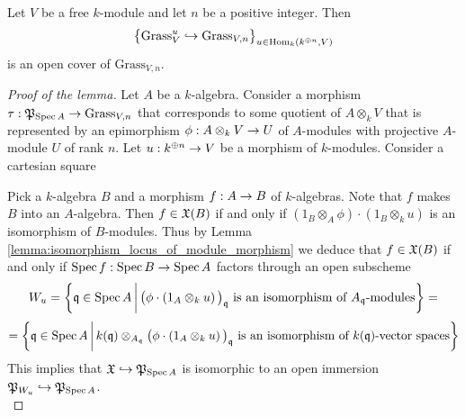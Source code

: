 \begin{lemma}\label{lemma:standard_open_cover_of_grassmannian}
Let $V$ be a free $k$-module and let $n$ be a positive integer. Then
$$\big\{\mathrm{Grass}_{V}^u\hookrightarrow \mathrm{Grass}_{V,n} \big\}_{u\in \mathrm{Hom}_k\left(k^{\oplus n},V\right)}$$
is an open cover of $\mathrm{Grass}_{V,n}$.
\end{lemma}
\begin{proof}[Proof of the lemma]
Let $A$ be a $k$-algebra. Consider a morphism $\tau:{\mathfrak P}_{\mathrm{Spec}\, A}\rightarrow \mathrm{Grass}_{V,n}$ that corresponds to some quotient of $A\otimes_kV$ that is represented by an epimorphism $\phi:A\otimes_kV\rightarrow U$ of $A$-modules with projective $A$-module $U$ of rank $n$. Let $u:k^{\oplus n}\rightarrow V$ be a morphism of $k$-modules. Consider a cartesian square
\begin{center}
\end{center}
Pick a $k$-algebra $B$ and a morphism $f:A\rightarrow B$ of $k$-algebras. Note that $f$ makes $B$ into an $A$-algebra. Then $f\in {\mathfrak X}(B)$ if and only if $\left(1_B\otimes_A\phi\right)\cdot \left(1_B\otimes_ku\right)$ is an isomorphism of $B$-modules. Thus by Lemma \ref{lemma:isomorphism_locus_of_module_morphism} we deduce that $f\in {\mathfrak X}(B)$ if and only if $\mathrm{Spec}\, f:\mathrm{Spec}\, B\rightarrow \mathrm{Spec}\, A$ factors through an open subscheme
$$W_u = \bigg\{\mathfrak{q}\in \mathrm{Spec}\, A\,\bigg|\,\big(\phi\cdot \left(1_A\otimes_ku\right)\big)_{\mathfrak{q}}\mbox{ is an isomorphism of }A_{\mathfrak{q}}\mbox{-modules}\bigg\} =$$
$$= \bigg\{\mathfrak{q}\in \mathrm{Spec}\, A\,\bigg|\,k(\mathfrak{q})\otimes_{A_{\mathfrak{q}}}\big(\phi\cdot \left(1_A\otimes_ku\right)\big)_{\mathfrak{q}}\mbox{ is an isomorphism of }k(\mathfrak{q})\mbox{-vector spaces}\bigg\}$$
This implies that ${\mathfrak X} \hookrightarrow {\mathfrak P}_{\mathrm{Spec}\, A}$ is isomorphic to an open immersion ${\mathfrak P}_{W_u}\hookrightarrow {\mathfrak P}_{\mathrm{Spec}\, A}$.\\

\end{proof}
